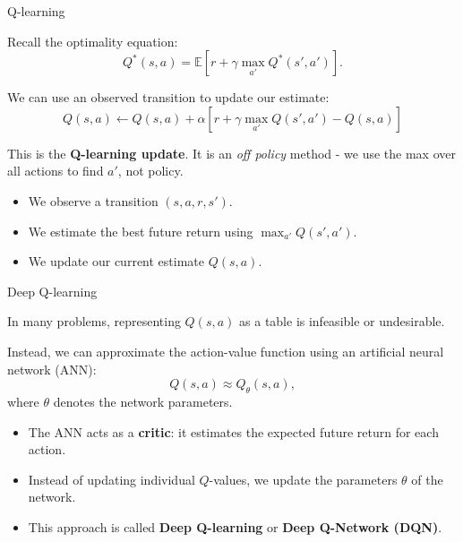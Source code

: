 \documentclass{beamer}
\begin{document}
\begin{frame}{Q-learning}
	\begin{flushleft}
	
	Recall the optimality equation:
	\[
	Q^*(s,a)=
	\mathbb{E}\left[
	r+\gamma\max_{a'}Q^*(s',a')
	\right].
	\]
	
	\vspace{0.2cm}
	
	We can use an observed transition to update our estimate:
	\[
	\boxed{
		Q(s,a)\leftarrow Q(s,a)+\alpha
		\left[
		r+\gamma\max_{a'}Q(s',a')
		-Q(s,a)
		\right]
	}
	\]
	
	\vspace{0.3cm}
	
	This is the \textbf{Q-learning update}.  It is an \emph{off policy} method - we use the max over all actions to find $a'$, not policy.
	
	\vspace{0.2cm}
	
	\begin{itemize}
		\item We observe a transition $(s,a,r,s')$.
		\item We estimate the best future return using
		$\max_{a'}Q(s',a')$.
		\item We update our current estimate $Q(s,a)$.
	\end{itemize}
	
	\end{flushleft}
\end{frame}


\begin{frame}{Deep Q-learning}
	\begin{flushleft}
	
	In many problems, representing $Q(s,a)$ as a table is
	infeasible or undesirable.
	
	\vspace{0.3cm}
	
	Instead, we can approximate the action-value function
	using an artificial neural network (ANN):
	\[
	Q(s,a) \approx Q_\theta(s,a),
	\]
	where $\theta$ denotes the network parameters.
	
	\vspace{0.3cm}
	
	\begin{itemize}
		\item The ANN acts as a \textbf{critic}: it estimates
		the expected future return for each action.
		\item Instead of updating individual $Q$-values,
		we update the parameters $\theta$ of the network.
		\item This approach is called
		\textbf{Deep Q-learning} or
		\textbf{Deep Q-Network (DQN)}.
	\end{itemize}
	
	\end{flushleft}
\end{frame}
\end{document}

